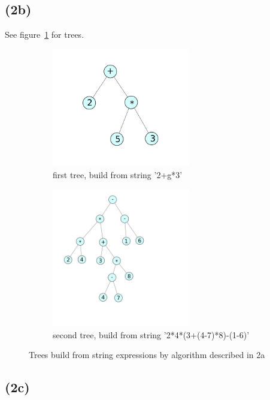 \documentclass[a4paper]{article}
\begin{document}
\subsection*{(2b)}

See figure~\ref{fig:trees} for trees.

\begin{figure}
  \begin{subfigure}[b]{0.5\textwidth}
    \centering
    \includegraphics[width=6cm]{tree1.png}
    \caption{first tree, build from string '2+g*3'}
  \end{subfigure}
  \begin{subfigure}[b]{0.5\textwidth}
    \includegraphics[width=6cm]{tree2.png}
    \caption{second tree, build from string '2*4*(3+(4-7)*8)-(1-6)'}
  \end{subfigure}
  \caption{Trees build from string expressions by algorithm described in 2a}
  \label{fig:trees}
\end{figure}


\subsection*{(2c)}
\end{document}
